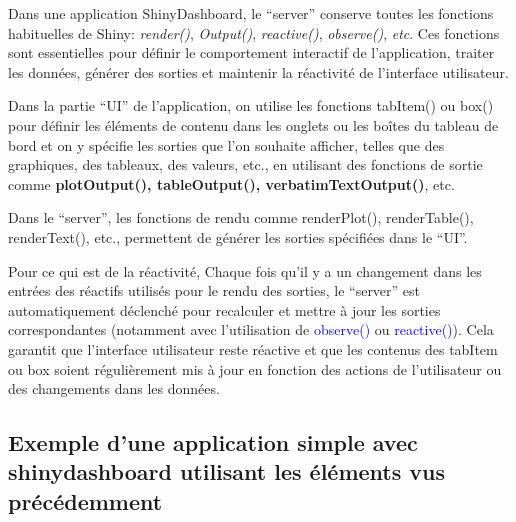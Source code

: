 \documentclass[
]{article}
\begin{document}
Dans une application ShinyDashboard, le ``server'' conserve toutes les
fonctions habituelles de Shiny: \emph{render()}, \emph{Output()},
\emph{reactive()}, \emph{observe()}, \emph{etc}. Ces fonctions sont
essentielles pour définir le comportement interactif de l'application,
traiter les données, générer des sorties et maintenir la réactivité de
l'interface utilisateur.

Dans la partie ``UI'' de l'application, on utilise les fonctions
tabItem() ou box() pour définir les éléments de contenu dans les onglets
ou les boîtes du tableau de bord et on y spécifie les sorties que l'on
souhaite afficher, telles que des graphiques, des tableaux, des valeurs,
etc., en utilisant des fonctions de sortie comme \textbf{plotOutput(),
tableOutput(), verbatimTextOutput()}, etc.

Dans le ``server'', les fonctions de rendu comme renderPlot(),
renderTable(), renderText(), etc., permettent de générer les sorties
spécifiées dans le ``UI''.

Pour ce qui est de la réactivité, Chaque fois qu'il y a un changement
dans les entrées des réactifs utilisés pour le rendu des sorties, le
``server'' est automatiquement déclenché pour recalculer et mettre à
jour les sorties correspondantes (notamment avec l'utilisation de
\textcolor{blue}{observe()} ou \textcolor{blue}{reactive()}). Cela
garantit que l'interface utilisateur reste réactive et que les contenus
des tabItem ou box soient régulièrement mis à jour en fonction des
actions de l'utilisateur ou des changements dans les données.

\hypertarget{exemple-dune-application-simple-avec-shinydashboard-utilisant-les-uxe9luxe9ments-vus-pruxe9cuxe9demment}{%
\subsection{Exemple d'une application simple avec shinydashboard
utilisant les éléments vus
précédemment}\label{exemple-dune-application-simple-avec-shinydashboard-utilisant-les-uxe9luxe9ments-vus-pruxe9cuxe9demment}}
\end{document}
